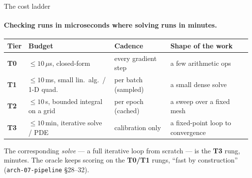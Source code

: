 \documentclass[aspectratio=169,10pt]{beamer}
\newcommand{\code}[1]{\texttt{#1}}
\newcommand{\cz}[1]{({\scriptsize\color{gray}#1})}     %
\begin{document}
\begin{frame}{The cost ladder}
  \framesubtitle{Checking runs in microseconds where solving runs in minutes.}
  \footnotesize
  \setlength{\tabcolsep}{5pt}
  \begin{center}
  \begin{tabular}{@{}llll@{}}
    \toprule
    Tier & Budget & Cadence & Shape of the work\\
    \midrule
    \textbf{T0} & $\leq 10\,\mu$s, closed-form & every gradient step & a few arithmetic ops\\
    \textbf{T1} & $\leq 10\,$ms, small lin.\ alg.\ / 1-D quad. & per batch (sampled) & a small dense solve\\
    \textbf{T2} & $\leq 10\,$s, bounded integral on a grid & per epoch (cached) & a sweep over a fixed mesh\\
    \textbf{T3} & $\leq 10\,$min, iterative solve / PDE & calibration only & a fixed-point loop to convergence\\
    \bottomrule
  \end{tabular}
  \end{center}
  \vspace{0.6em}
  \normalsize
  The corresponding \emph{solve} --- a full iterative loop from scratch --- is the \textbf{T3}
  rung, minutes. The oracle keeps scoring on the \textbf{T0/T1} rungs, ``fast by construction''
  \cz{\code{arch-07-pipeline} \S28--32}.
\end{frame}
\end{document}
